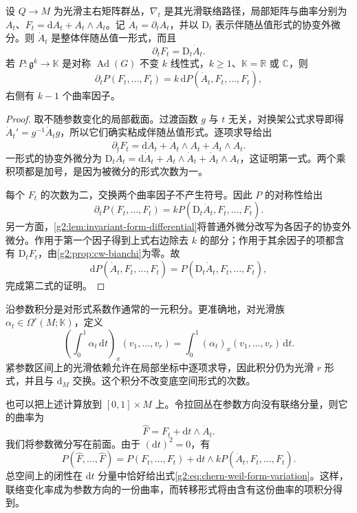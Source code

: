 \begin{proposition}\label{g2:prop:curvature-path-variation}
	设 \(Q\to M\) 为光滑主右矩阵群丛，\(\nabla_t\) 是其光滑联络路径，局部矩阵与曲率分别为 \(A_t\)、\(F_t=\mathrm dA_t+A_t\wedge A_t\)。记 \(\dot A_t=\partial_tA_t\)，并以 \(\mathrm D_t\) 表示伴随丛值形式的协变外微分。则 \(\dot A_t\) 是整体伴随丛值一形式，而且
	\begin{equation}\label{g2:eq:curvature-path-variation}
		\partial_tF_t=\mathrm D_t\dot A_t.
	\end{equation}
	若 \(P:\mathfrak g^k\to\mathbb K\) 是对称 \(\operatorname{Ad}(G)\) 不变 \(k\) 线性式，\(k\ge1\)、\(\mathbb K=\mathbb R\) 或 \(\mathbb C\)，则
	\begin{equation}\label{g2:eq:chern-weil-form-variation}
		\partial_tP(F_t,\ldots,F_t)
		=k\,\mathrm dP(\dot A_t,F_t,\ldots,F_t),
	\end{equation}
	右侧有 \(k-1\) 个曲率因子。
\end{proposition}
\begin{proof}
	取不随参数变化的局部截面。过渡函数 \(g\) 与 \(t\) 无关，对换架公式求导即得 \(\dot A_t'=g^{-1}\dot A_tg\)，所以它们确实粘成伴随丛值形式。逐项求导给出
	\[
		\partial_tF_t=\mathrm d\dot A_t+\dot A_t\wedge A_t+A_t\wedge\dot A_t.
	\]
	一形式的协变外微分为 \(\mathrm D_t\dot A_t=\mathrm d\dot A_t+A_t\wedge\dot A_t+\dot A_t\wedge A_t\)，这证明第一式。两个乘积项都是加号，是因为被微分的形式次数为一。

	每个 \(F_t\) 的次数为二，交换两个曲率因子不产生符号。因此 \(P\) 的对称性给出
	\[
		\partial_tP(F_t,\ldots,F_t)
		=kP(\mathrm D_t\dot A_t,F_t,\ldots,F_t).
	\]
	另一方面，\cref{g2:lem:invariant-form-differential}将普通外微分改写为各因子的协变外微分。作用于第一个因子得到上式右边除去 \(k\) 的部分；作用于其余因子的项都含有 \(\mathrm D_tF_t\)，由\cref{g2:prop:cw-bianchi}为零。故
	\[
		\mathrm dP(\dot A_t,F_t,\ldots,F_t)
		=P(\mathrm D_t\dot A_t,F_t,\ldots,F_t),
	\]
	完成第二式的证明。
\end{proof}

沿参数积分是对形式系数作通常的一元积分。更准确地，对光滑族 \(\alpha_t\in\Omega^r(M;\mathbb K)\)，定义
\[
	\left(\int_0^1\alpha_t\,\mathrm dt\right)_x(v_1,\ldots,v_r)
	=\int_0^1(\alpha_t)_x(v_1,\ldots,v_r)\,\mathrm dt.
\]
紧参数区间上的光滑依赖允许在局部坐标中逐项求导，因此积分仍为光滑 \(r\) 形式，并且与 \(\mathrm d_M\) 交换。这个积分不改变底空间形式的次数。

\ProseParagraphBreak

也可以把上述计算放到 \([0,1]\times M\) 上。令拉回丛在参数方向没有联络分量，则它的曲率为
\[
	\widehat F=F_t+\mathrm dt\wedge\dot A_t.
\]
我们将参数微分写在前面。由于 \((\mathrm dt)^2=0\)，有
\begin{equation}\label{g2:eq:chern-weil-cylinder-form}
	P(\widehat F,\ldots,\widehat F)
	=P(F_t,\ldots,F_t)+\mathrm dt\wedge kP(\dot A_t,F_t,\ldots,F_t).
\end{equation}
总空间上的闭性在 \(\mathrm dt\) 分量中恰好给出式\eqref{g2:eq:chern-weil-form-variation}。这样，联络变化率成为参数方向的一份曲率，而转移形式将由含有这份曲率的项积分得到。

